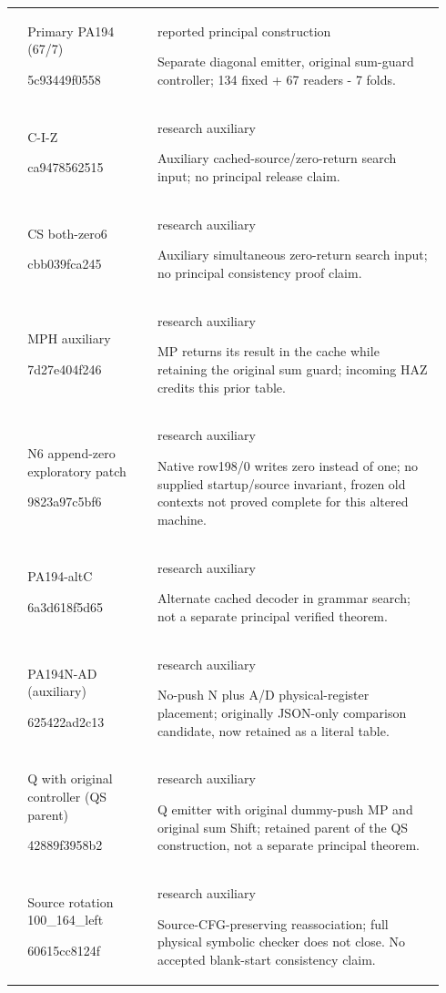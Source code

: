 {\begin{longtable}{@{}>{\raggedright\arraybackslash}p{0.035\linewidth}>{\raggedright\arraybackslash}p{0.28\linewidth}>{\raggedright\arraybackslash}p{0.625\linewidth}@{}}
45 & Primary PA194 (67/7)\par{\ttfamily 5c93449f0558} & reported principal construction\par Separate diagonal emitter, original sum-guard controller; 134 fixed + 67 readers - 7 folds.\\[4pt]
46 & C-I-Z\par{\ttfamily ca9478562515} & research auxiliary\par Auxiliary cached-source/zero-return search input; no principal release claim.\\[4pt]
47 & CS both-zero6\par{\ttfamily cbb039fca245} & research auxiliary\par Auxiliary simultaneous zero-return search input; no principal consistency proof claim.\\[4pt]
48 & MPH auxiliary\par{\ttfamily 7d27e404f246} & research auxiliary\par MP returns its result in the cache while retaining the original sum guard; incoming HAZ credits this prior table.\\[4pt]
49 & N6 append-zero exploratory patch\par{\ttfamily 9823a97c5bf6} & research auxiliary\par Native row198/0 writes zero instead of one; no supplied startup/source invariant, frozen old contexts not proved complete for this altered machine.\\[4pt]
50 & PA194-altC\par{\ttfamily 6a3d618f5d65} & research auxiliary\par Alternate cached decoder in grammar search; not a separate principal verified theorem.\\[4pt]
51 & PA194N-AD (auxiliary)\par{\ttfamily 625422ad2c13} & research auxiliary\par No-push N plus A/D physical-register placement; originally JSON-only comparison candidate, now retained as a literal table.\\[4pt]
52 & Q with original controller (QS parent)\par{\ttfamily 42889f3958b2} & research auxiliary\par Q emitter with original dummy-push MP and original sum Shift; retained parent of the QS construction, not a separate principal theorem.\\[4pt]
53 & Source rotation 100\_164\_left\par{\ttfamily 60615cc8124f} & research auxiliary\par Source-CFG-preserving reassociation; full physical symbolic checker does not close. No accepted blank-start consistency claim.\\[4pt]

\end{longtable}}
